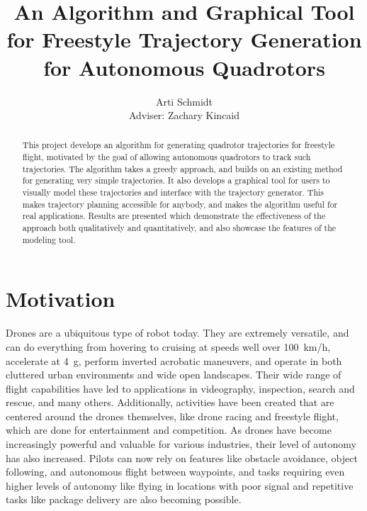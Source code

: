 \documentclass[pageno]{jpaper}
\begin{document}
\title{An Algorithm and Graphical Tool for Freestyle Trajectory Generation for Autonomous Quadrotors}

\author{Arti Schmidt \\ Adviser: Zachary Kincaid}

\date{}
\maketitle

\thispagestyle{empty}
\doublespacing
\begin{abstract}
This project develops an algorithm for generating quadrotor trajectories for freestyle flight, motivated by the goal of allowing autonomous quadrotors to track such trajectories. The algorithm takes a greedy approach, and builds on an existing method for generating very simple trajectories. It also develops a graphical tool for users to visually model these trajectories and interface with the trajectory generator. This makes trajectory planning accessible for anybody, and makes the algorithm useful for real applications. Results are presented which demonstrate the effectiveness of the approach both qualitatively and quantitatively, and also showcase the features of the modeling tool.
\end{abstract}

\section{Motivation}

Drones are a ubiquitous type of robot today. They are extremely versatile, and can do everything from hovering to cruising at speeds well over \qty{100}{km/h}, accelerate at \qty{4}{g}, perform inverted acrobatic maneuvers, and operate in both cluttered urban environments and wide open landscapes. Their wide range of flight capabilities have led to applications in videography, inspection, search and rescue, and many others. Additionally, activities have been created that are centered around the drones themselves, like drone racing and freestyle flight, which are done for entertainment and competition. As drones have become increasingly powerful and valuable for various industries, their level of autonomy has also increased. Pilots can now rely on features like obstacle avoidance, object following, and autonomous flight between waypoints, and tasks requiring even higher levels of autonomy like flying in locations with poor signal and repetitive tasks like package delivery are also becoming possible.
\end{document}
